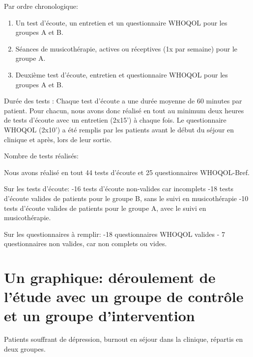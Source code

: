  Par ordre chronologique:
 
\begin{enumerate} 
        \item Un test d'écoute, un entretien et un questionnaire
          WHOQOL pour les groupes A et B.
        \item Séances de musicothérapie, actives ou réceptives (1x par
          semaine) pour le groupe A.
        \item Deuxième test d'écoute, entretien et questionnaire
          WHOQOL pour les groupes A et B.
\end{enumerate}

	
	
	Durée des tests : Chaque test d'écoute a une durée  moyenne de
        60 minutes par patient. Pour chacun, nous avons donc réalisé
        en tout au minimum deux heures de tests d'écoute avec un
        entretien (2x15') à chaque fois.
        Le questionnaire WHOQOL (2x10')  a été remplis par les
        patients avant le début du séjour en clinique et après, lors
        de leur sortie.
        
       
      
        Nombre de tests réalisés:
        
     Nous avons réalisé en tout 44 tests d'écoute et 25 questionnaires 
     WHOQOL-Bref.
     
     Sur les tests d'écoute:
     -16 tests d'écoute non-valides car 
     incomplets
     -18 tests d'écoute valides de patients pour le groupe B, sans le suivi en 
     musicothérapie
     -10 tests d'écoute valides de patients pour le groupe A, avec le
     suivi en musicothérapie.

     
     Sur les questionnaires à remplir: 
     -18 questionnaires WHOQOL valides
     -  7 questionnaires non valides, car non complets ou vides.
     
     
          
 
 
 	
 	
       

 	
 	\section{Un graphique: déroulement de l'étude avec un groupe
          de contrôle et un groupe d'intervention}





                                      Patients souffrant de dépression, burnout
                                               en séjour dans la
                                               clinique, répartis en
                                               deux groupes.
                                             

